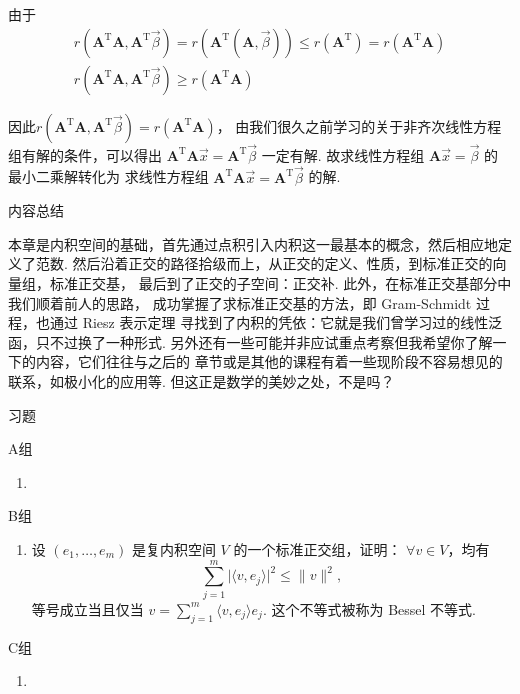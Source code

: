 由于
\begin{gather*}
r(\mathbf{A}^{\mathrm{T}}\mathbf{A}, \mathbf{A}^{\mathrm{T}}\vec{\beta})
= r (\mathbf{A}^{\mathrm{T}}(\mathbf{A}, \vec{\beta})) \leqslant r(\mathbf{A}^{\mathrm{T}}) = r(\mathbf{A}^{\mathrm{T}}\mathbf{A}) \\
r(\mathbf{A}^{\mathrm{T}}\mathbf{A}, \mathbf{A}^{\mathrm{T}}\vec{\beta}) \geqslant r(\mathbf{A}^{\mathrm{T}}\mathbf{A})
\end{gather*}

因此$r(\mathbf{A}^{\mathrm{T}}\mathbf{A}, \mathbf{A}^{\mathrm{T}}\vec{\beta}) = r(\mathbf{A}^{\mathrm{T}}\mathbf{A})$，
由我们很久之前学习的关于非齐次线性方程组有解的条件，可以得出 $ \mathbf{A}^{\mathrm{T}}\mathbf{A}\vec{x} = \mathbf{A}^{\mathrm{T}}\vec{\beta}$ 一定有解.
故求线性方程组 $\mathbf{A}\vec{x} = \vec{\beta}$ 的最小二乘解转化为
求线性方程组 $ \mathbf{A}^{\mathrm{T}}\mathbf{A}\vec{x} = \mathbf{A}^{\mathrm{T}}\vec{\beta}$ 的解.

\normalsize

\vspace{2ex}

\centerline{\heiti \Large 内容总结}

本章是内积空间的基础，首先通过点积引入内积这一最基本的概念，然后相应地定义了范数.
然后沿着正交的路径拾级而上，从正交的定义、性质，到标准正交的向量组，标准正交基，
最后到了正交的子空间：正交补. 此外，在标准正交基部分中我们顺着前人的思路，
成功掌握了求标准正交基的方法，即 Gram-Schmidt 过程，也通过 Riesz 表示定理
寻找到了内积的凭依：它就是我们曾学习过的线性泛函，只不过换了一种形式.
另外还有一些可能并非应试重点考察但我希望你了解一下的内容，它们往往与之后的
章节或是其他的课程有着一些现阶段不容易想见的联系，如极小化的应用等.
但这正是数学的美妙之处，不是吗？

\vspace{2ex}

\centerline{\heiti \Large 习题}
\vspace{2ex}
{\kaishu }
\begin{flushright}
    \kaishu

\end{flushright}
\centerline{\heiti A组}
\begin{enumerate}
    \item
\end{enumerate}
\centerline{\heiti B组}
\begin{enumerate}
    \item 设 $ (e_1, \ldots , e_m) $ 是复内积空间 $ V $ 的一个标准正交组，证明：
    $ \forall v \in V $，均有 
    \[
        \sum_{j = 1}^{m} \lvert \langle v, e_j \rangle \rvert^2 
        \leqslant \lVert v \rVert^2,
    \]
    等号成立当且仅当 $ v = \sum_{j = 1}^{m} \langle v, e_j \rangle e_j $. 
    这个不等式被称为 Bessel 不等式. 
\end{enumerate}
\centerline{\heiti C组}
\begin{enumerate}
    \item
\end{enumerate}

